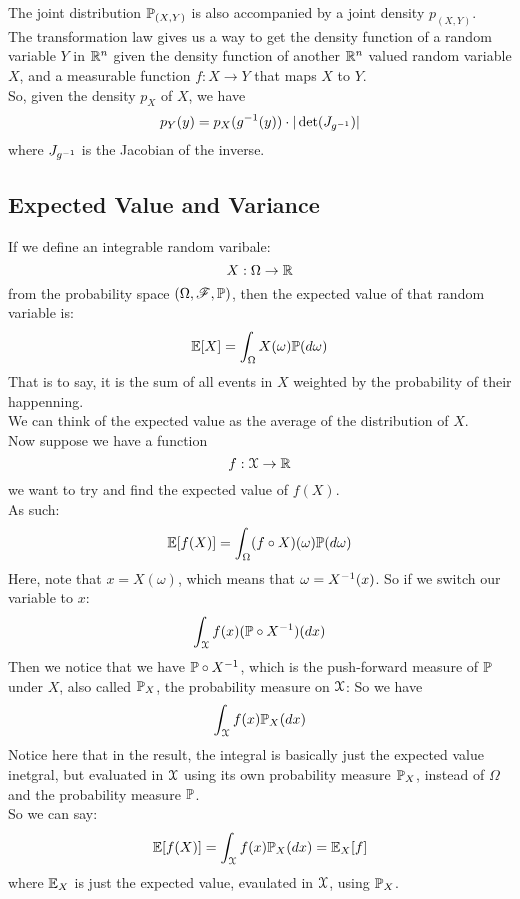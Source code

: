 \documentclass[12pt]{article}
\begin{document}
    The joint distribution $\mathbb{P}_{(X, Y)}$
    is also accompanied by a joint density
    $p_{(X, Y)}$. \\ 

    The transformation law
    gives us a way to get the density function
    of a random variable $Y$ in $\mathbb{R}^n$
    given the density
    function of another $\mathbb{R}^n$ valued
    random variable $X$,
    and a measurable function $f: X \to Y$
    that maps $X$ to $Y$. \\
    So, given the density $p_X$ of $X$,
    we have
    \[ p_Y(y) = p_X(g^{-1}(y))\cdot|\det(J_{g^{-1}})| \]
    where $J_{g^{-1}}$ is the Jacobian
    of the inverse.

    \newpage

    \subsection*{Expected Value and Variance}
    
    If we define an integrable random varibale:
    \[ X: \Omega \to \mathbb{R} \]
    from the probability space
    $(\Omega, \mathscr{F}, \mathbb{P})$,
    then the expected value
    of that random variable is:
    \[ \mathbb{E}[X] = \int_{\Omega}X(\omega)
    \mathbb{P}(d\omega) \]
    That is to say,
    it is the sum of all events
    in $X$ weighted by the probability
    of their happenning. \\
    We can think of the expected value
    as the average of the distribution
    of $X$. \\

    Now suppose we have a function
    \[ f: \mathcal{X} \to \mathbb{R} \]
    we want to try and find
    the expected value of $f(X)$. \\
    As such:
    \[ \mathbb{E}[f(X)]
    = \int_{\Omega}(f \circ X)(\omega)
    \mathbb{P}(d\omega) \]
    Here, note that $x = X(\omega)$,
    which means that $\omega = X^{-1}(x)$.
    So if we switch our variable to $x$:
    \[\int_{\mathcal{X}}f(x)(\mathbb{P} \circ X^{-1})(dx) \]
    Then we notice that we have $\mathbb{P} \circ X^{-1}$,
    which is the push-forward measure of $\mathbb{P}$
    under $X$, also called $\mathbb{P}_X$,
    the probability measure on $\mathcal{X}$:
    So we have
    \[ \int_{\mathcal{X}}f(x)\mathbb{P}_X(dx) \]
    Notice here that in the result,
    the integral is basically just the expected
    value inetgral, but evaluated
    in $\mathcal{X}$ using its own probability
    measure $\mathbb{P}_X$,
    instead of $\Omega$ and the probability
    measure $\mathbb{P}$. \\
    So we can say:
    \[ \mathbb{E}[f(X)] 
    = \int_{\mathcal{X}}f(x)\mathbb{P}_X(dx) 
    = \mathbb{E}_X[f] \]
    where $\mathbb{E}_X$ is just the expected value,
    evaulated in $\mathcal{X}$,
    using $\mathbb{P}_X$. \\
\end{document}
